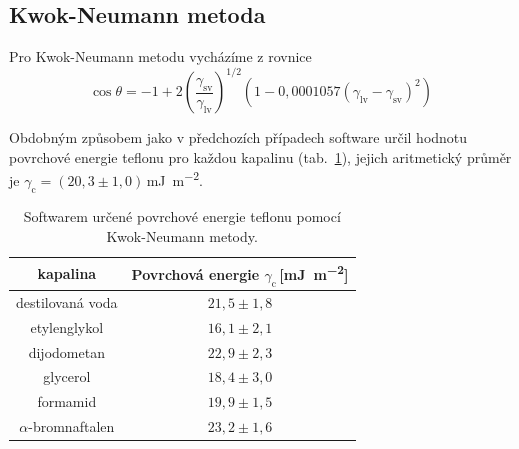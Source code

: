 \documentclass{protokol}
\begin{document}
\subsection{Kwok-Neumann metoda}
\par Pro Kwok-Neumann metodu vycházíme z rovnice
\begin{equation}
	\cos\theta = -1 + 
	2 {\left(\frac{\gamma_{\text{sv}}}{\gamma_{\text{lv}}}\right)}^{1/2} 
	\left(1-0,0001057(\gamma_{\text{lv}} - \gamma_{\text{sv}})^2\right)
\end{equation}

Obdobným způsobem jako v předchozích případech software určil hodnotu povrchové 
energie teflonu pro každou kapalinu (tab.~\ref{table:KwokNeumann}), jejich 
aritmetický průměr je 
$\gamma_{\text{c}} = (20,3\pm1,0)$\,\si{\milli\joule\per\meter\squared}.

\begin{table}[h]
	\caption{Softwarem určené povrchové energie teflonu pomocí Kwok-Neumann 
	metody.}
	\label{table:KwokNeumann}
	\begin{tabular}{|c|c|}\hline
		kapalina  & Povrchová energie 
		$\gamma_{\text{c}}$\,[\si{\milli\joule\per\meter\squared}] \\ \hline
		destilovaná voda & $21,5 \pm 1,8$     \\
		etylenglykol     & $16,1 \pm 2,1$     \\
		dijodometan      & $22,9 \pm 2,3$     \\
		glycerol         & $18,4 \pm 3,0$     \\
		formamid         & $19,9 \pm 1,5$     \\
		$\alpha$-bromnaftalen & $23,2 \pm 1,6$\\ \hline
	\end{tabular}
\end{table}
\end{document}
